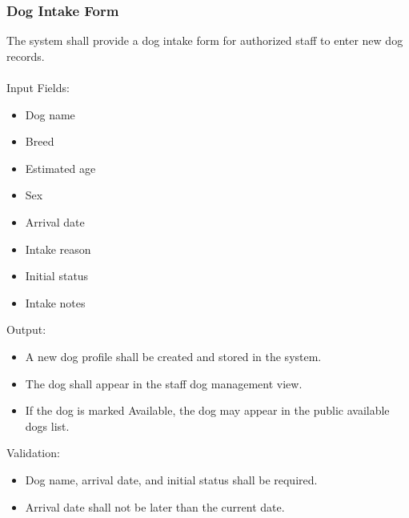 \documentclass[12pt]{article}
\begin{document}
\subsubsection{Dog Intake Form}
The system shall provide a dog intake form for authorized staff to enter new dog records.\\
\\
Input Fields:
\begin{itemize}\item Dog name\end{itemize}
\begin{itemize}\item Breed\end{itemize}
\begin{itemize}\item Estimated age\end{itemize}
\begin{itemize}\item Sex\end{itemize}
\begin{itemize}\item Arrival date\end{itemize}
\begin{itemize}\item Intake reason\end{itemize}
\begin{itemize}\item Initial status\end{itemize}
\begin{itemize}\item Intake notes\end{itemize}
Output:
\begin{itemize}\item A new dog profile shall be created and stored in the system.\end{itemize}
\begin{itemize}\item The dog shall appear in the staff dog management view.\end{itemize}
\begin{itemize}\item If the dog is marked Available, the dog may appear in the public available dogs list.\end{itemize}
Validation:
\begin{itemize}\item Dog name, arrival date, and initial status shall be required.\end{itemize}
\begin{itemize}\item Arrival date shall not be later than the current date.\end{itemize}
\end{document}
